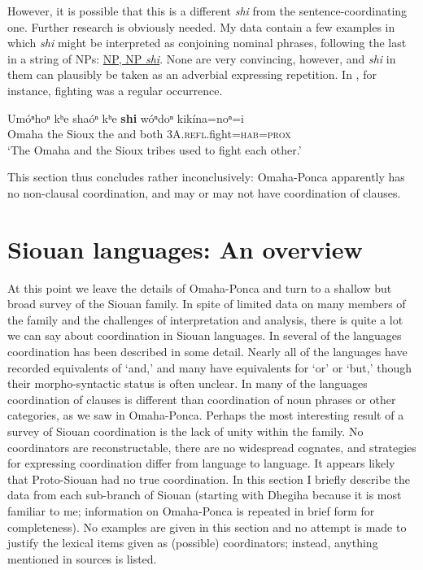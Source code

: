\documentclass[output=paper]{LSP/langsci}
\begin{document}
However, it is possible that this is a different \textit{shi} from the sentence-coordinating one. Further research is obviously needed. My data contain a few examples in which \textit{shi} might be interpreted as conjoining nominal phrases, following the last in a string of NPs:  \underline{NP, NP \textit{shi}}. None are very convincing, however, and \textit{shi} in them can plausibly be taken as an adverbial expressing repetition. In , for instance, fighting was a regular occurrence.

\begin{exe}
\ex\label{ex:rudin:35}
\gll Umóⁿhoⁿ kʰe shaóⁿ kʰe \textbf{shi}  wóⁿdoⁿ 	kikína=noⁿ=i \\
Omaha    	the 	Sioux  	the 	and both \textsc{3A}.\textsc{refl}.fight=\textsc{hab}=\textsc{prox} \\
\trans `The Omaha and the Sioux tribes used to fight each other.'    
\end{exe}

This section thus concludes rather inconclusively: Omaha-Ponca apparently has no non-clausal coordination, and may or may not have coordination of clauses. 

\section{Siouan languages: An overview}\label{sec:rudin:4}

At this point we leave the details of Omaha-Ponca and turn to a shallow but broad survey of the Siouan family. In spite of limited data on many members of the family and the challenges of interpretation and analysis, there is quite a lot we can say about coordination in Siouan languages. In several of the languages coordination has been described in some detail. Nearly all of the languages have recorded equivalents of `and,' and many have equivalents for `or' or `but,' though their morpho-syntactic status is often unclear. In many of the languages coordination of clauses is different than coordination of noun phrases or other categories, as we saw in Omaha-Ponca. Perhaps the most interesting result of a survey of Siouan coordination is the lack of unity within the family. No coordinators are reconstructable, there are no widespread cognates, and strategies for expressing coordination differ from language to language. It appears likely that Proto-Siouan had no true coordination. In this section I briefly describe the data from each sub-branch of Siouan (starting with Dhegiha because it is most familiar to me; information on Omaha-Ponca is repeated in brief form for completeness). No examples are given in this section and no attempt is made to justify the lexical items given as (possible) coordinators; instead, anything mentioned in sources is listed.
\end{document}
